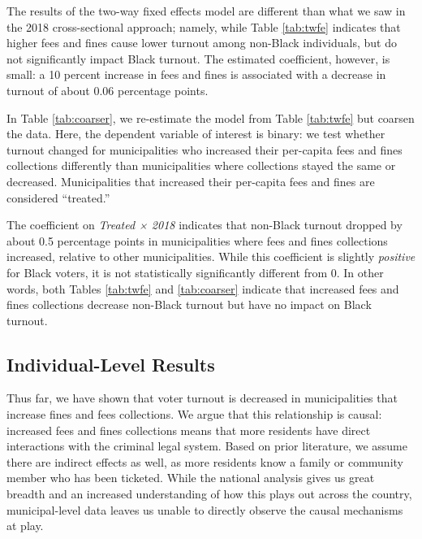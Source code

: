 \documentclass[
  12pt,
]{article}
\begin{document}
The results of the two-way fixed effects model are different than what we saw in the 2018 cross-sectional approach; namely, while Table \ref{tab:twfe} indicates that higher fees and fines cause lower turnout among non-Black individuals, but do not significantly impact Black turnout. The estimated coefficient, however, is small: a 10 percent increase in fees and fines is associated with a decrease in turnout of about 0.06 percentage points.

In Table \ref{tab:coarser}, we re-estimate the model from Table \ref{tab:twfe} but coarsen the data. Here, the dependent variable of interest is binary: we test whether turnout changed for municipalities who increased their per-capita fees and fines collections differently than municipalities where collections stayed the same or decreased. Municipalities that increased their per-capita fees and fines are considered ``treated.''

\begin{singlespace}

\end{singlespace}

The coefficient on \emph{Treated × 2018} indicates that non-Black turnout dropped by about 0.5 percentage points in municipalities where fees and fines collections increased, relative to other municipalities. While this coefficient is slightly \emph{positive} for Black voters, it is not statistically significantly different from 0. In other words, both Tables \ref{tab:twfe} and \ref{tab:coarser} indicate that increased fees and fines collections decrease non-Black turnout but have no impact on Black turnout.

\hypertarget{individual-level-results}{%
\subsection*{Individual-Level Results}\label{individual-level-results}}

Thus far, we have shown that voter turnout is decreased in municipalities that increase fines and fees collections. We argue that this relationship is causal: increased fees and fines collections means that more residents have direct interactions with the criminal legal system. Based on prior literature, we assume there are indirect effects as well, as more residents know a family or community member who has been ticketed. While the national analysis gives us great breadth and an increased understanding of how this plays out across the country, municipal-level data leaves us unable to directly observe the causal mechanisms at play.
\end{document}
